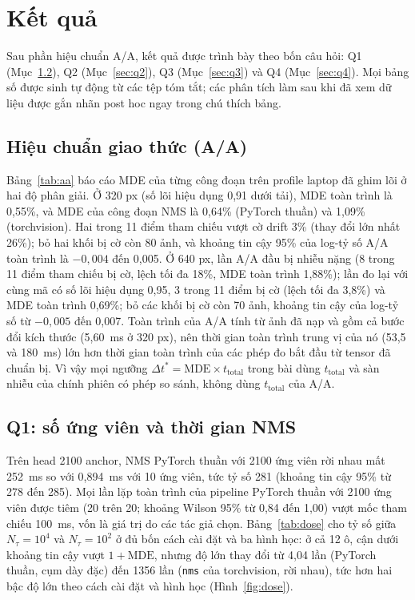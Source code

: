 \documentclass[12pt,a4paper]{article}
\newcommand{\Ntau}{N_{\tau}}
\begin{document}
\section{Kết quả}
\label{sec:results}
Sau phần hiệu chuẩn A/A, kết quả được trình bày theo bốn câu hỏi: Q1 (Mục~\ref{sec:q1}), Q2 (Mục~\ref{sec:q2}), Q3 (Mục~\ref{sec:q3}) và Q4 (Mục~\ref{sec:q4}). Mọi bảng số được sinh tự động từ các tệp tóm tắt; các phân tích làm sau khi đã xem dữ liệu được gắn nhãn post hoc ngay trong chú thích bảng.

\subsection{Hiệu chuẩn giao thức (A/A)}
\label{sec:newprotocol}
Bảng~\ref{tab:aa} báo cáo MDE của từng công đoạn trên profile laptop đã ghim lõi ở hai độ phân giải. Ở 320 px (số lõi hiệu dụng 0,91 dưới tải), MDE toàn trình là 0,55\%, và MDE của công đoạn NMS là 0,64\% (PyTorch thuần) và 1,09\% (torchvision). Hai trong 11 điểm tham chiếu vượt cờ drift 3\% (thay đổi lớn nhất 26\%); bỏ hai khối bị cờ còn 80 ảnh, và khoảng tin cậy 95\% của log-tỷ số A/A toàn trình là $-0{,}004$ đến 0,005. Ở 640 px, lần A/A đầu bị nhiễu nặng (8 trong 11 điểm tham chiếu bị cờ, lệch tối đa 18\%, MDE toàn trình 1,88\%); lần đo lại với cùng mã có số lõi hiệu dụng 0,95, 3 trong 11 điểm bị cờ (lệch tối đa 3,8\%) và MDE toàn trình 0,69\%; bỏ các khối bị cờ còn 70 ảnh, khoảng tin cậy của log-tỷ số từ $-0{,}005$ đến 0,007. Toàn trình của A/A tính từ ảnh đã nạp và gồm cả bước đổi kích thước (5,60~ms ở 320 px), nên thời gian toàn trình trung vị của nó (53,5 và 180~ms) lớn hơn thời gian toàn trình của các phép đo bắt đầu từ tensor đã chuẩn bị. Vì vậy mọi ngưỡng $\Delta t^{*} = \mathrm{MDE}\times t_{\mathrm{total}}$ trong bài dùng $t_{\mathrm{total}}$ và sàn nhiễu của chính phiên có phép so sánh, không dùng $t_{\mathrm{total}}$ của A/A.



\subsection{Q1: số ứng viên và thời gian NMS}
\label{sec:q1}
Trên head 2100 anchor, NMS PyTorch thuần với 2100 ứng viên rời nhau mất 252~ms so với 0,894~ms với 10 ứng viên, tức tỷ số 281 (khoảng tin cậy 95\% từ 278 đến 285). Mọi lần lặp toàn trình của pipeline PyTorch thuần với 2100 ứng viên được tiêm (20 trên 20; khoảng Wilson 95\% từ 0,84 đến 1,00) vượt mốc tham chiếu 100~ms, vốn là giá trị do các tác giả chọn. Bảng~\ref{tab:dose} cho tỷ số giữa $\Ntau=10^4$ và $\Ntau=10^2$ ở đủ bốn cách cài đặt và ba hình học: ở cả 12 ô, cận dưới khoảng tin cậy vượt $1+\mathrm{MDE}$, nhưng độ lớn thay đổi từ 4,04 lần (PyTorch thuần, cụm dày đặc) đến 1356 lần (\texttt{nms} của torchvision, rời nhau), tức hơn hai bậc độ lớn theo cách cài đặt và hình học (Hình~\ref{fig:dose}).
\end{document}
